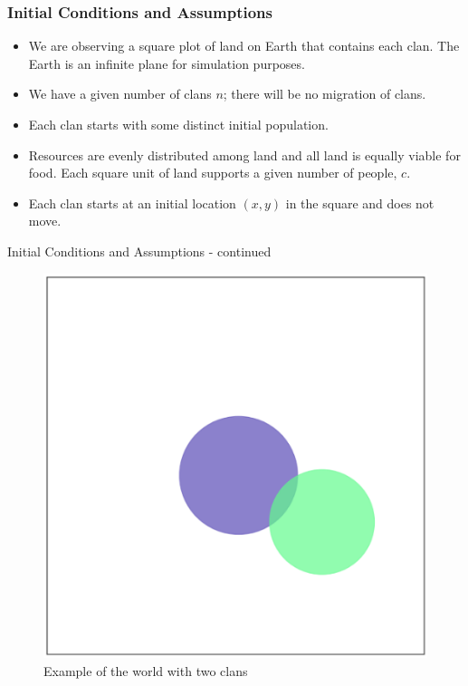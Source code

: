 \documentclass[t]{beamer}
\begin{document}
\begin{frame}
\frametitle{Initial Conditions and Assumptions}

\begin{itemize}
\item We are observing a square plot of land on Earth that contains each clan. The Earth is an infinite plane for simulation purposes.
\\
\item We have a given number of clans $n$; there will be no migration of clans.
\\
\item Each clan starts with some distinct initial population.
\\
\item Resources are evenly distributed among land and all land is equally viable for food. Each square unit of land supports a given number of people, $c$.
\\
\item Each clan starts at an initial location $(x,y)$ in the square and does not move.
\end{itemize}

\end{frame}

\begin{frame}{Initial Conditions and Assumptions - continued}
\begin{figure}
\includegraphics[scale=0.4]{diagram.png} %
\caption{Example of the world with two clans}
\end{figure}
\end{frame}
\end{document}
